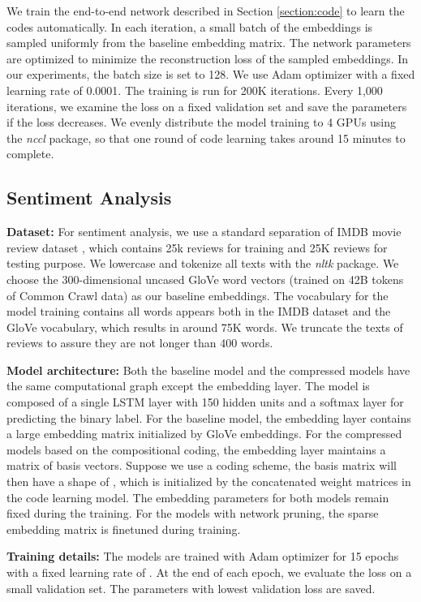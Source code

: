 \documentclass{article} \usepackage{iclr2018_conference_review,times}
\begin{document}
We train the end-to-end network described in Section \ref{section:code} to learn the codes automatically. In each iteration, a small batch of the embeddings is sampled uniformly from the baseline embedding matrix. The network parameters are optimized to minimize the reconstruction loss of the sampled embeddings. In our experiments, the batch size is set to 128. We use Adam optimizer \citep{kingma2014adam} with a fixed learning rate of 0.0001. The training is run for 200K iterations. Every 1,000 iterations, we examine the loss on a fixed validation set and save the parameters if the loss decreases. We evenly distribute the model training to 4 GPUs using the {\it nccl} package, so that one round of code learning takes around 15 minutes to complete.

\subsection{Sentiment Analysis}
\label{section:imdb}

{\bf Dataset:} \: For sentiment analysis, we use a standard separation of IMDB movie review dataset \citep{Maas2011LearningWV}, which contains 25k reviews for training and 25K reviews for testing purpose. We lowercase and tokenize all texts with the {\it nltk} package. We choose the 300-dimensional uncased GloVe word vectors (trained on 42B tokens of Common Crawl data) as our baseline embeddings. The vocabulary for the model training contains all words appears both in the IMDB dataset and the GloVe vocabulary, which results in around 75K words. We truncate the texts of reviews to assure they are not longer than 400 words. 

{\bf Model architecture:} \: Both the baseline model and the compressed models have the same computational graph except the embedding layer. The model is composed of a single LSTM layer with 150 hidden units and a softmax layer for predicting the binary label. For the baseline model, the embedding layer contains a large  embedding matrix initialized by GloVe embeddings. For the compressed models based on the compositional coding, the embedding layer maintains a matrix of basis vectors. Suppose we use a  coding scheme, the basis matrix will then have a shape of , which is initialized by the concatenated weight matrices  in the code learning model. The embedding parameters for both models remain fixed during the training. For the models with network pruning, the sparse embedding matrix is finetuned during training.

{\bf Training details:} \: The models are trained with Adam optimizer for 15 epochs with a fixed learning rate of . At the end of each epoch, we evaluate the loss on a small validation set. The parameters with lowest validation loss are saved.
\end{document}
